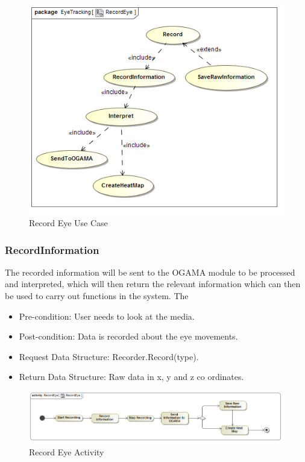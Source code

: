 \begin{figure}[!ht]
	\centering 
	\includegraphics[scale=0.5]{Diagrams/Use_Case_Diagram__RecordEye.png}
	\caption{Record Eye Use Case}
	\label{RecordEye}
	\end{figure}
	
\subsubsection{RecordInformation}
The recorded information will be sent to the OGAMA module to be processed and interpreted, which will then return the relevant information which can then be used to carry out functions in the system.
The
\begin{itemize}
\item Pre-condition: User needs to look at the media.
\item Post-condition: Data is recorded about the eye movements.
\item Request Data Structure: Recorder.Record(type).
\item Return Data Structure: Raw data in x, y and z co ordinates.
\end{itemize}

\begin{figure}[!ht]
	\centering
	\includegraphics[scale=0.5]{Diagrams/Activity_Diagram__RecordEye__RecordEye.png}
	\caption{Record Eye Activity}
	\end{figure}

